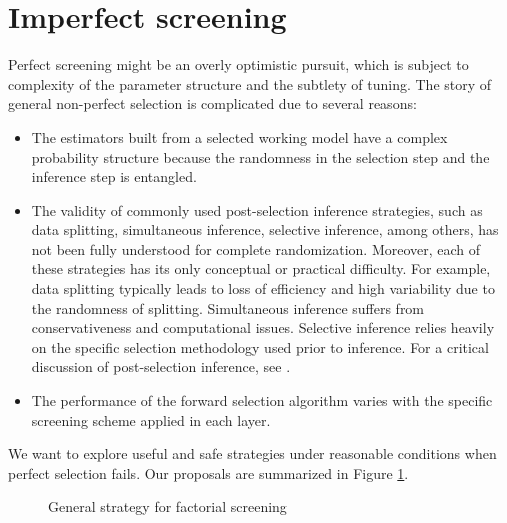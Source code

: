 \documentclass[12pt]{article}
\begin{document}
\section{Imperfect  screening}\label{sec:imperfect-ms}

Perfect screening might be an overly optimistic pursuit, which is subject to complexity of the parameter structure and the subtlety of tuning. The story of general non-perfect selection is complicated due to several reasons:
\begin{itemize}
    \item The estimators built from a selected working model have a complex probability structure because the randomness in the selection step and the inference step is entangled.
    \item The validity of commonly used post-selection inference strategies, such as data splitting, simultaneous inference, selective inference, among others, has not been fully understood for complete randomization. Moreover, each of these strategies has its only conceptual or practical difficulty. For example, data splitting typically leads to loss of efficiency and high variability due to the randomness of splitting.  Simultaneous inference suffers from conservativeness and computational issues. Selective inference relies heavily on the specific selection methodology used prior to inference. For a critical discussion of post-selection inference, see \cite{kuchibhotla2022post}.
    \item The performance of the forward selection algorithm varies with the specific  screening scheme applied in each layer.
\end{itemize}

We want to explore useful and safe strategies under reasonable conditions when perfect selection fails. Our proposals are summarized in Figure \ref{fig:general-strategy}.
\begin{figure}[!htbp]
\centering
{}
\caption{General strategy for factorial  screening}
\label{fig:general-strategy}
\end{figure}
\end{document}
